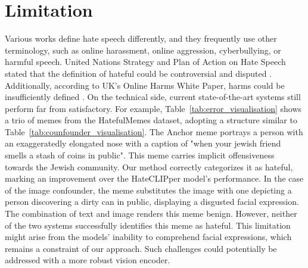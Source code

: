 \documentclass[11pt]{article}
\begin{document}
\section{Limitation}
Various works define hate speech differently, and they frequently use other terminology, such as online harassment, online aggression, cyberbullying, or harmful speech. United Nations Strategy and Plan of Action on Hate Speech stated that the definition of hateful could be controversial and disputed \cite{united_nations_2020}. 
Additionally, according to UK's Online Harms White Paper, harms could be insufficiently defined \cite{uk_parliament_2022}.
On the technical side, current state-of-the-art systems still perform far from satisfactory. For example, Table~\ref{tab:error_visualisation} shows a trio of memes from the HatefulMemes dataset, adopting a structure similar to Table~\ref{tab:counfounder_visualisation}. The Anchor meme portrays a person with an exaggeratedly elongated nose with a caption of "when your jewish friend smells a stash of coins in public". This meme carries implicit offensiveness towards the Jewish community. Our method correctly categorizes it as hateful, marking an improvement over the HateCLIPper model's performance.  In the case of the image confounder, the meme substitutes the image with one depicting a person discovering a dirty can in public, displaying a disgusted facial expression. The combination of text and image renders this meme benign. However, neither of the two systems successfully identifies this meme as hateful. This limitation might arise from the models' inability to comprehend facial expressions, which remains a constraint of our approach. Such challenges could potentially be addressed with a more robust vision encoder. 
\end{document}
